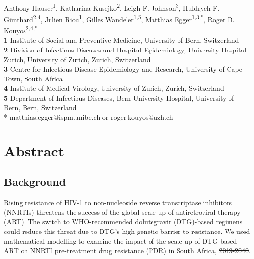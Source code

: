 \documentclass[10pt,letterpaper]{article}
\providecommand{\DIFaddtex}[1]{{\protect\color{blue}\uwave{#1}}} %
\providecommand{\DIFdeltex}[1]{{\protect\color{red}\sout{#1}}}                      %
\providecommand{\DIFaddbegin}{} %
\providecommand{\DIFaddend}{} %
\providecommand{\DIFdelbegin}{} %
\providecommand{\DIFdelend}{} %
\providecommand{\DIFadd}[1]{\texorpdfstring{\DIFaddtex{#1}}{#1}} %
\providecommand{\DIFdel}[1]{\texorpdfstring{\DIFdeltex{#1}}{}} %
\newcommand{\DIFscaledelfig}{0.5}
\newlength{\DIFdelgraphicswidth} %
\newlength{\DIFdelgraphicsheight} %
\newcommand{\DIFaddincludegraphics}[2][]{{\color{blue}\fbox{\DIFOincludegraphics[#1]{#2}}}} %
\newcommand{\DIFdelincludegraphics}[2][]{%
\sbox{\DIFdelgraphicsbox}{\DIFOincludegraphics[#1]{#2}}%
\settoboxwidth{\DIFdelgraphicswidth}{\DIFdelgraphicsbox} %
\settoboxtotalheight{\DIFdelgraphicsheight}{\DIFdelgraphicsbox} %
\scalebox{\DIFscaledelfig}{%
\parbox[b]{\DIFdelgraphicswidth}{\usebox{\DIFdelgraphicsbox}\\[-\baselineskip] \rule{\DIFdelgraphicswidth}{0em}}\llap{\resizebox{\DIFdelgraphicswidth}{\DIFdelgraphicsheight}{%
\setlength{\unitlength}{\DIFdelgraphicswidth}%
\begin{picture}(1,1)%
\thicklines\linethickness{2pt} %
{\color[rgb]{1,0,0}\put(0,0){\framebox(1,1){}}}%
{\color[rgb]{1,0,0}\put(0,0){\line( 1,1){1}}}%
{\color[rgb]{1,0,0}\put(0,1){\line(1,-1){1}}}%
\end{picture}%
}\hspace*{3pt}}} %
} %
\DeclareRobustCommand{\DIFaddbegin}{\DIFOaddbegin \let\includegraphics\DIFaddincludegraphics} %
\DeclareRobustCommand{\DIFaddend}{\DIFOaddend \let\includegraphics\DIFOincludegraphics} %
\DeclareRobustCommand{\DIFdelbegin}{\DIFOdelbegin \let\includegraphics\DIFdelincludegraphics} %
\DeclareRobustCommand{\DIFdelend}{\DIFOaddend \let\includegraphics\DIFOincludegraphics} %
\begin{document}
\vspace*{0.2in}

\begin{flushleft}
{\Large
\textbf{} 
}
\newline
\\
Anthony Hauser\textsuperscript{1},
Katharina Kusejko\textsuperscript{2},
Leigh F. Johnson\textsuperscript{3},
Huldrych F. Günthard\textsuperscript{2,4},
Julien Riou\textsuperscript{1},
Gilles Wandeler\textsuperscript{1,5},
Matthias Egger\textsuperscript{1,3,*},
Roger D. Kouyos\textsuperscript{2,4,*}
\\
\bigskip
\textbf{1} Institute of Social and Preventive Medicine, University of Bern, Switzerland
\\
\textbf{2} Division of Infectious Diseases and Hospital Epidemiology, University Hospital Zurich, University of Zurich, Zurich, Switzerland
\\
\textbf{3} Centre for Infectious Disease Epidemiology and Research, University of Cape Town, South Africa
\\
\textbf{4} Institute of Medical Virology, University of Zurich, Zurich, Switzerland
\\
\textbf{5} Department of Infectious Diseases, Bern University Hospital, University of Bern, Bern, Switzerland
\\
\bigskip
* matthias.egger@ispm.unibe.ch or roger.kouyos@uzh.ch

\end{flushleft}
\DIFaddbegin 


\DIFaddend \section*{Abstract}
\subsection*{Background} Rising resistance of HIV-1 to non-nucleoside reverse transcriptase inhibitors (NNRTIs) threatens the success of the global scale-up of antiretroviral therapy (ART). The switch to WHO-recommended dolutegravir (DTG)-based regimens could reduce this threat due to DTG’s high genetic barrier to resistance. We used mathematical modelling to \DIFdelbegin \DIFdel{examine }\DIFdelend \DIFaddbegin \DIFadd{predict }\DIFaddend the impact of the scale-up of DTG-based ART on NNRTI pre-treatment drug resistance (PDR) in South Africa, \DIFdelbegin \DIFdel{2019-2040}\DIFdelend \DIFaddbegin \DIFadd{2020-2040}\DIFaddend .
\end{document}

